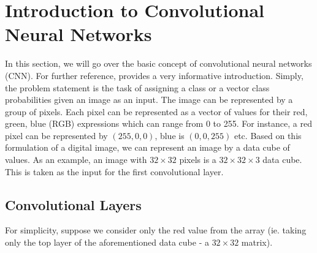 \section{Introduction to Convolutional Neural Networks} \label{sec:introductioncnn}

In this section, we will go over the basic concept of convolutional neural networks (CNN). For further reference, \cite{deshpande16} provides a very informative introduction. Simply, the problem statement is the task of assigning a class or a vector class probabilities given an image as an input. The image can be represented by a group of pixels. Each pixel can be represented as a vector of values for their red, green, blue (RGB) expressions which can range from 0 to 255. For instance, a red pixel can be represented by $(255, 0, 0)$, blue is $(0,0,255)$ etc. Based on this formulation of a digital image, we can represent an image by a data cube of values. As an example, an image with $32 \times 32$ pixels is a $32 \times 32 \times 3$ data cube.  This is taken as the input for the first convolutional layer.

\subsection{Convolutional Layers} \label{sec:convolayers}

For simplicity, suppose we consider only the red value from the array (ie. taking only the top layer of the aforementioned data cube -  a $32 \times 32$ matrix).